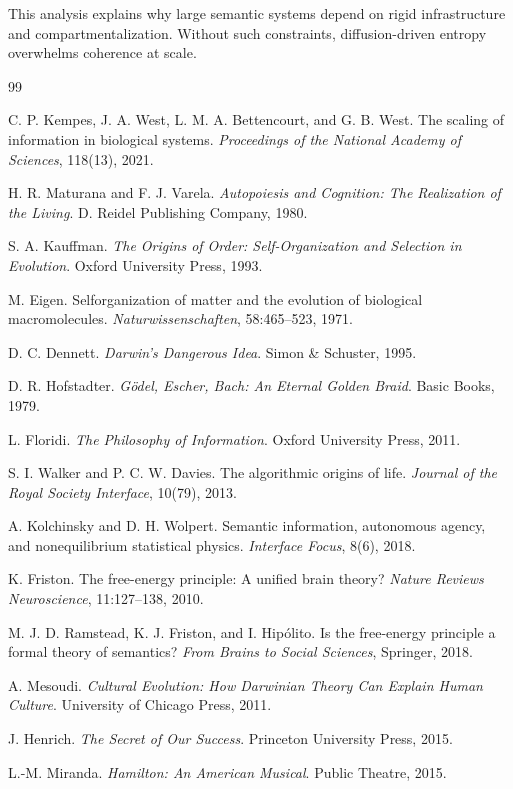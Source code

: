 \documentclass[11pt,oneside]{article}
\begin{document}
This analysis explains why large semantic systems depend on rigid infrastructure and compartmentalization. Without such constraints, diffusion-driven entropy overwhelms coherence at scale.

\newpage
\begin{thebibliography}{99}

C. P. Kempes, J. A. West, L. M. A. Bettencourt, and G. B. West.
\newblock The scaling of information in biological systems.
\newblock \emph{Proceedings of the National Academy of Sciences}, 118(13), 2021.

H. R. Maturana and F. J. Varela.
\newblock \emph{Autopoiesis and Cognition: The Realization of the Living}.
\newblock D. Reidel Publishing Company, 1980.

S. A. Kauffman.
\newblock \emph{The Origins of Order: Self-Organization and Selection in Evolution}.
\newblock Oxford University Press, 1993.

M. Eigen.
\newblock Selforganization of matter and the evolution of biological macromolecules.
\newblock \emph{Naturwissenschaften}, 58:465–523, 1971.

D. C. Dennett.
\newblock \emph{Darwin's Dangerous Idea}.
\newblock Simon \& Schuster, 1995.

D. R. Hofstadter.
\newblock \emph{Gödel, Escher, Bach: An Eternal Golden Braid}.
\newblock Basic Books, 1979.

L. Floridi.
\newblock \emph{The Philosophy of Information}.
\newblock Oxford University Press, 2011.

S. I. Walker and P. C. W. Davies.
\newblock The algorithmic origins of life.
\newblock \emph{Journal of the Royal Society Interface}, 10(79), 2013.

A. Kolchinsky and D. H. Wolpert.
\newblock Semantic information, autonomous agency, and nonequilibrium statistical physics.
\newblock \emph{Interface Focus}, 8(6), 2018.

K. Friston.
\newblock The free-energy principle: A unified brain theory?
\newblock \emph{Nature Reviews Neuroscience}, 11:127–138, 2010.

M. J. D. Ramstead, K. J. Friston, and I. Hipólito.
\newblock Is the free-energy principle a formal theory of semantics?
\newblock \emph{From Brains to Social Sciences}, Springer, 2018.

A. Mesoudi.
\newblock \emph{Cultural Evolution: How Darwinian Theory Can Explain Human Culture}.
\newblock University of Chicago Press, 2011.

J. Henrich.
\newblock \emph{The Secret of Our Success}.
\newblock Princeton University Press, 2015.

L.-M. Miranda.
\newblock \emph{Hamilton: An American Musical}.
\newblock Public Theatre, 2015.

\end{thebibliography}
\end{document}
